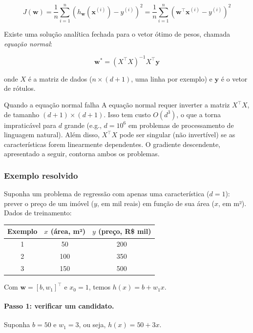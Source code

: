 \documentclass[12pt,a4paper]{article}
\begin{document}
\[
J(\mathbf{w}) = \frac{1}{n} \sum_{i=1}^{n} \left(h_\mathbf{w}(\mathbf{x}^{(i)}) - y^{(i)}\right)^2 = \frac{1}{n} \sum_{i=1}^n \left(\mathbf{w}^\top \mathbf{x}^{(i)} - y^{(i)}\right)^2
\]

Existe uma solução analítica fechada para o vetor ótimo de pesos, chamada \emph{equação normal}:

\[
\mathbf{w}^* = (X^\top X)^{-1} X^\top \mathbf{y}
\]

onde $X$ é a matriz de dados ($n \times (d+1)$, uma linha por exemplo) e $\mathbf{y}$ é o vetor de rótulos.

\begin{alertabox}{Quando a equação normal falha}
A equação normal requer inverter a matriz $X^\top X$, de tamanho $(d+1) \times (d+1)$. Isso tem custo $O(d^3)$, o que a torna impraticável para $d$ grande (e.g., $d = 10^6$ em problemas de processamento de linguagem natural). Além disso, $X^\top X$ pode ser singular (não invertível) se as características forem linearmente dependentes. O gradiente descendente, apresentado a seguir, contorna ambos os problemas.
\end{alertabox}

\subsubsection{Exemplo resolvido}

Suponha um problema de regressão com apenas uma característica ($d=1$): prever o preço de um imóvel ($y$, em mil reais) em função de sua área ($x$, em m²). Dados de treinamento:

\medskip
\begin{center}
\begin{tabular}{ccc}
\toprule
Exemplo & $x$ (área, m²) & $y$ (preço, R\$ mil) \\
\midrule
1 & 50  & 200 \\
2 & 100 & 350 \\
3 & 150 & 500 \\
\bottomrule
\end{tabular}
\end{center}

\medskip
Com $\mathbf{w} = [b, w_1]^\top$ e $x_0 = 1$, temos $h(x) = b + w_1 x$.

\paragraph{Passo 1: verificar um candidato.} Suponha $b = 50$ e $w_1 = 3$, ou seja, $h(x) = 50 + 3x$.
\end{document}
